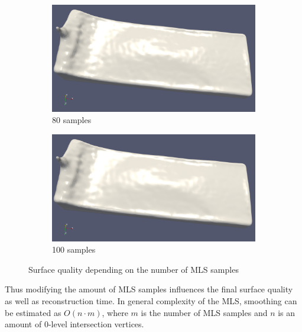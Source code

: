 \begin{figure}[H]
\begin{center}
\begin{subfigure}[b]{0.4\textwidth}
			\includegraphics[width=\textwidth]{figures/MlsSamples80png.png}
			\caption{80 samples}
		\end{subfigure}
		\begin{subfigure}[b]{0.4\textwidth}
			\includegraphics[width=\textwidth]{figures/MlsSamples100.png}
			\caption{100 samples}
		\end{subfigure}
	\end{center}
	\caption{Surface quality depending on the number of MLS samples} \label{fig:mls_samples_example_surfaces}
\end{figure}
Thus modifying the amount of MLS samples influences the final surface quality as well as reconstruction time. In general complexity of the MLS, smoothing can be estimated as $O(n \cdot m)$, where $m$ is the number of MLS samples and $n$ is an amount of 0-level intersection vertices.
